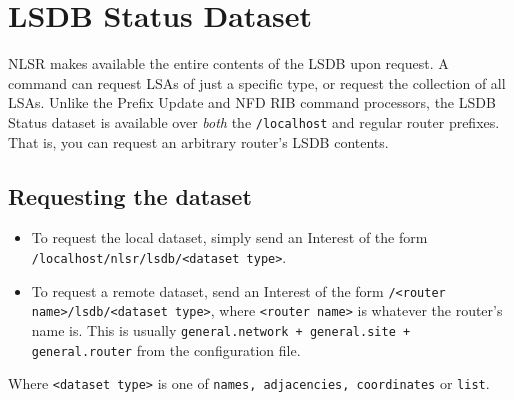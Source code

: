\section{LSDB Status Dataset}
\label{sec:lsdb-status-dataset}

NLSR makes available the entire contents of the LSDB upon request. A
command can request LSAs of just a specific type, or request the
collection of all LSAs. Unlike the Prefix Update and NFD RIB command
processors, the LSDB Status dataset is available over \emph{both} the
\texttt{/localhost} and regular router prefixes. That is, you can
request an arbitrary router's LSDB contents.

\subsection{Requesting the dataset}
\begin{itemize}
\item To request the local dataset, simply send an Interest of the
  form \texttt{/localhost/nlsr/lsdb/<dataset type>}.
\item To request a remote dataset, send an Interest of the form
  \texttt{/<router name>/lsdb/<dataset type>}, where \texttt{<router
    name>} is whatever the router's name is. This is usually
  \texttt{general.network + general.site + general.router} from the
  configuration file.
\end{itemize}

Where \texttt{<dataset type>} is one of \texttt{names, adjacencies, coordinates} or \texttt{list}.
